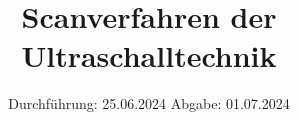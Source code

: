 

\subject{VUS2}
\title{Scanverfahren der Ultraschalltechnik}
\date{%
  Durchführung: 25.06.2024
  \hspace{3em}
  Abgabe: 01.07.2024
}



\maketitle
\thispagestyle{empty}
\tableofcontents
\newpage






\printbibliography{}


